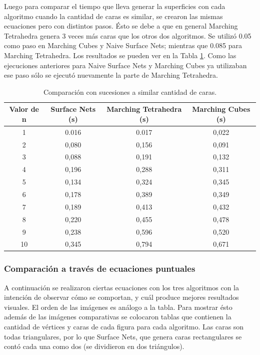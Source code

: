 \documentclass[12pt]{article}
\begin{document}
Luego para comparar el tiempo que lleva generar la superficies con cada algoritmo cuando la cantidad de caras es similar, se crearon las mismas ecuaciones pero con distintos pasos. Ésto se debe a que en general Marching Tetrahedra genera 3 veces más caras que los otros dos algoritmos. Se utilizó 0.05 como paso en Marching Cubes y Naive Surface Nets; mientras que 0.085 para Marching Tetrahedra. Los resultados se pueden ver en la Tabla \ref{tablaSIC}. Como las ejecuciones anteriores para Naive Surface Nets y Marching Cubes ya utilizaban ese paso sólo se ejecutó nuevamente la parte de Marching Tetrahedra.
\begin{table}[h!]
  \centering
  \begin{tabular}{cccc}
    \toprule
    Valor de n & Surface Nets (s) & Marching Tetrahedra (s) & Marching Cubes (s)\\
    \midrule
    1 & 0.016 & 0.017 & 0,022\\
    2 & 0,080 & 0,156 & 0,091\\
    3 & 0,088 & 0,191 & 0,132\\
    4 & 0,196 & 0,288 & 0,311\\
    5 & 0,134 & 0,324 & 0,345\\
    6 & 0,178 & 0,389 & 0,349\\
    7 & 0,189 & 0,413 & 0,432\\
    8 & 0,220 & 0,455 & 0,478\\
    9 & 0,238 & 0,596 & 0,520\\
    10 & 0,345 & 0,794 & 0,671\\
    \bottomrule
  \end{tabular}
  \caption{Comparación con sucesiones a similar cantidad de caras.}
  \label{tablaSIC}
\end{table}
\clearpage
\subsubsection{Comparación a través de ecuaciones puntuales}
A continuación se realizaron ciertas ecuaciones con los tres algoritmos con la intención de observar cómo se comportan, y cuál produce mejores resultados visuales. El orden de las imágenes es análogo a la tabla. Para mostrar ésto además de las imágenes comparativas se colocaron tablas que contienen la cantidad de vértices y caras de cada figura para cada algoritmo. Las caras son todas triangulares, por lo que Surface Nets, que genera caras rectangulares se contó cada una como dos (se dividieron en dos triángulos).
\end{document}
